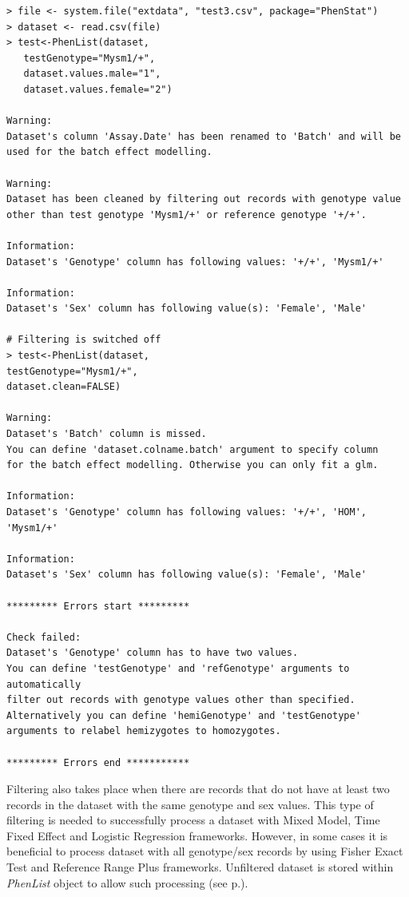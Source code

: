 \documentclass[12pt,a4paper]{article}
\begin{document}
\begingroup
    \fontsize{8pt}{12pt}\selectfont
\begin{verbatim}
> file <- system.file("extdata", "test3.csv", package="PhenStat") 
> dataset <- read.csv(file)
> test<-PhenList(dataset,
   testGenotype="Mysm1/+",
   dataset.values.male="1",
   dataset.values.female="2")

Warning:
Dataset's column 'Assay.Date' has been renamed to 'Batch' and will be used for the batch effect modelling.

Warning:
Dataset has been cleaned by filtering out records with genotype value 
other than test genotype 'Mysm1/+' or reference genotype '+/+'.

Information:
Dataset's 'Genotype' column has following values: '+/+', 'Mysm1/+'

Information:
Dataset's 'Sex' column has following value(s): 'Female', 'Male'

# Filtering is switched off
> test<-PhenList(dataset,
testGenotype="Mysm1/+",
dataset.clean=FALSE)

Warning:
Dataset's 'Batch' column is missed.
You can define 'dataset.colname.batch' argument to specify column 
for the batch effect modelling. Otherwise you can only fit a glm.

Information:
Dataset's 'Genotype' column has following values: '+/+', 'HOM', 'Mysm1/+'

Information:
Dataset's 'Sex' column has following value(s): 'Female', 'Male'

********* Errors start *********

Check failed:
Dataset's 'Genotype' column has to have two values.
You can define 'testGenotype' and 'refGenotype' arguments to automatically 
filter out records with genotype values other than specified. 
Alternatively you can define 'hemiGenotype' and 'testGenotype' arguments to relabel hemizygotes to homozygotes.

********* Errors end ***********
\end{verbatim}
\endgroup

Filtering also takes place when there are records that do not have at least two records in the dataset with the same genotype and sex values. This type of filtering is needed to successfully process a dataset with Mixed Model, Time Fixed Effect and Logistic Regression frameworks. However, in some cases it is beneficial to process dataset with all genotype/sex records by using Fisher Exact Test and Reference Range Plus frameworks. Unfiltered dataset is stored within \textit{PhenList} object to allow such processing (see p.\pageref{specificArguments}).    
\end{document}
